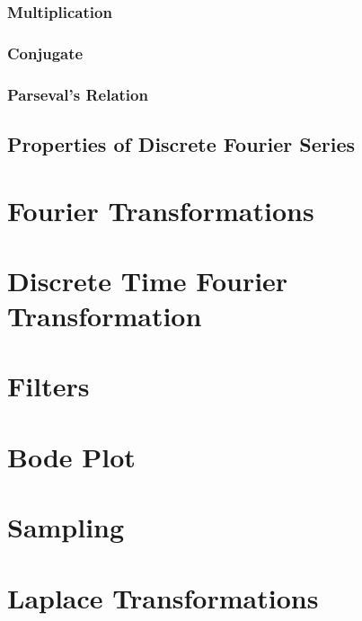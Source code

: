 \documentclass[12pt,letterpaper]{article} \usepackage{amsmath} \usepackage{graphicx} \usepackage[margin=1in]{geometry} \usepackage{longtable}  \usepackage{amssymb}
\begin{document}
	\subsubsection{Multiplication}
	
	\subsubsection{Conjugate}
	
	\subsubsection{Parseval's Relation}
	
	\subsection{Properties of Discrete Fourier Series}
	
	\section{Fourier Transformations}
	
	\section{Discrete Time Fourier Transformation}
	
	\section{Filters}
	
	\section{Bode Plot}
	
	\section{Sampling}
	
	\section{Laplace Transformations}
	
	
\end{document}
